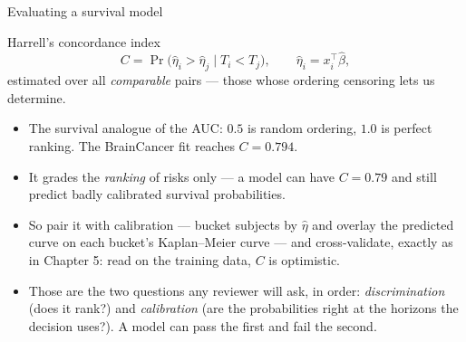 \documentclass[aspectratio=169,11pt]{beamer}
\begin{document}
\begin{frame}{Evaluating a survival model}
  \scriptsize
  \begin{block}{Harrell's concordance index}
    \[
      C=\Pr\bigl(\hat\eta_i>\hat\eta_j \;\big|\; T_i<T_j\bigr),
      \qquad \hat\eta_i=x_i^{\top}\hat\beta ,
    \]
    estimated over all \emph{comparable} pairs --- those whose ordering censoring lets us
    determine.
  \end{block}
  \begin{readme}
    \begin{itemize}
      \item The survival analogue of the AUC: $0.5$ is random ordering, $1.0$ is perfect
            ranking. The BrainCancer fit reaches $C=0.794$.
      \item It grades the \emph{ranking} of risks only --- a model can have $C=0.79$ and
            still predict badly calibrated survival probabilities.
      \item So pair it with calibration --- bucket subjects by $\hat\eta$ and overlay the
            predicted curve on each bucket's Kaplan--Meier curve --- and cross-validate,
            exactly as in Chapter 5: read on the training data, $C$ is optimistic.
      \item Those are the two questions any reviewer will ask, in order:
            \emph{discrimination} (does it rank?) and \emph{calibration} (are the
            probabilities right at the horizons the decision uses?). A model can pass the
            first and fail the second.
    \end{itemize}
  \end{readme}
\end{frame}
\end{document}

